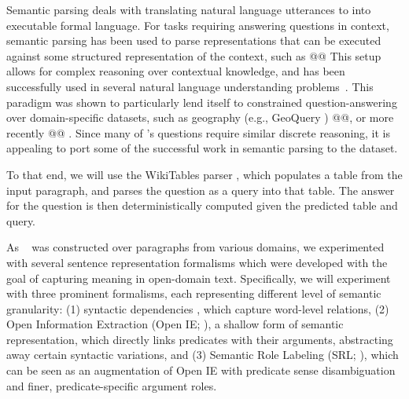 
Semantic parsing deals with translating natural language utterances to
into executable formal language. For tasks requiring answering questions in context, semantic parsing
has been used to parse representations that can be
executed against some structured representation of the context, such as @@
This setup allows for complex reasoning over contextual knowledge, and has
been successfully used in several natural language understanding
problems~\citep[among others]{berant2013semantic,Yin2017ASN,chen2011learning}.
This paradigm was shown to particularly lend itself to constrained question-answering
over domain-specific datasets, such as geography (e.g., GeoQuery \cite{geoquery})
@@, or more recently @@ .
Since many of \drop's questions require similar discrete reasoning, it is appealing
to port some of the successful work in semantic parsing to the \drop dataset.

To that end, we will use the WikiTables parser \cite{Krishnamurthy2017neuralsp},
which populates a table from the input paragraph, and
parses the question as a query into that table.
The answer for the question is then deterministically computed given the predicted table
and query.

As \drop~ was constructed over paragraphs from various domains,
we experimented with several sentence representation formalisms which were
developed with the goal of capturing meaning in open-domain text.
Specifically, we will experiment with three prominent formalisms, each
representing different level of semantic granularity:
(1) syntactic dependencies \cite{sd}, which capture word-level relations,
(2) Open Information Extraction (Open IE; \cite{oie}), a shallow
form of semantic representation, which directly links predicates
with their arguments, abstracting away certain syntactic variations, and
(3) Semantic Role Labeling (SRL; \cite{srl}), which can be seen as an
augmentation of Open IE with predicate sense disambiguation and finer, predicate-specific
argument roles.

